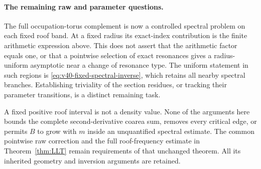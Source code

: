 \paragraph{The remaining raw and parameter questions.}
The full occupation-torus complement is now a controlled spectral
problem on each fixed roof band. At a fixed radius its exact-index
contribution is the finite arithmetic expression above. This does
not assert that the arithmetic factor equals one, or that a pointwise
selection of exact resonances gives a radius-uniform asymptotic near
a change of resonance type. The uniform statement in such regions is
\eqref{eq:v40-fixed-spectral-inverse}, which retains all nearby
spectral branches. Establishing triviality of the section residues,
or tracking their parameter transitions, is a distinct remaining task.

A fixed positive roof interval is not a density value. None of the
arguments here bounds the complete second-derivative coarea sum,
removes every critical edge, or permits $B$ to grow with $m$ inside
an unquantified spectral estimate. The common pointwise raw correction
and the full roof-frequency estimate in Theorem~\ref{thm:LLT} remain
requirements of that unchanged theorem. All its inherited geometry
and inversion arguments are retained.
